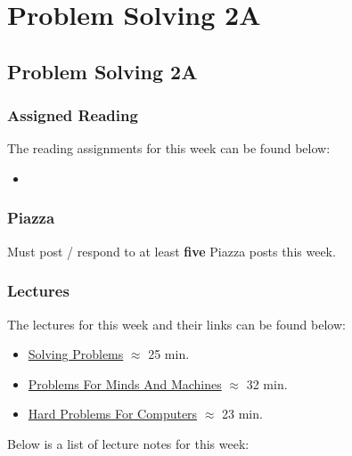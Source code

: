 \clearpage

\renewcommand{\ChapTitle}{Problem Solving 2A}
\renewcommand{\SectionTitle}{Problem Solving 2A}

\chapter{\ChapTitle}
\section{\SectionTitle}

\subsection{Assigned Reading}

The reading assignments for this week can be found below:

\begin{itemize}
    \item {}
\end{itemize}

\subsection{Piazza}

Must post / respond to at least \textbf{five} Piazza posts this week.  

\subsection{Lectures}

The lectures for this week and their links can be found below:

\begin{itemize}
    \item \href{https://www.youtube.com/watch?v=YvkDeQP-pQM}{Solving Problems} $\approx$ 25 min.
    \item \href{https://www.youtube.com/watch?v=8h0okzEM13M}{Problems For Minds And Machines} $\approx$ 32 min.
    \item \href{https://www.youtube.com/watch?v=6qwk8NKR0UM}{Hard Problems For Computers} $\approx$ 23 min.
\end{itemize}

\noindent Below is a list of lecture notes for this week:

